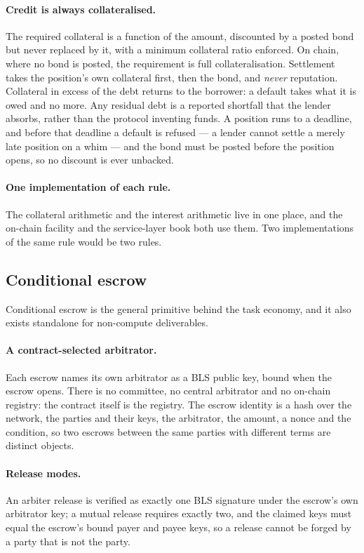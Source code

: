 \documentclass{article}
\begin{document}
\paragraph{Credit is always collateralised.} The required collateral is a
function of the amount, discounted by a posted bond but never replaced by it,
with a minimum collateral ratio enforced. On chain, where no bond is posted,
the requirement is full collateralisation. Settlement takes the position's own
collateral first, then the bond, and \emph{never} reputation. Collateral in
excess of the debt returns to the borrower: a default takes what it is owed
and no more. Any residual debt is a reported shortfall that the lender absorbs,
rather than the protocol inventing funds. A position runs to a deadline, and
before that deadline a default is refused --- a lender cannot settle a merely
late position on a whim --- and the bond must be posted before the position
opens, so no discount is ever unbacked.

\paragraph{One implementation of each rule.} The collateral arithmetic and the
interest arithmetic live in one place, and the on-chain facility and the
service-layer book both use them. Two implementations of the same rule would
be two rules.

\subsection{Conditional escrow}
\label{sec:escrow}

Conditional escrow is the general primitive behind the task economy, and it
also exists standalone for non-compute deliverables.

\paragraph{A contract-selected arbitrator.} Each escrow names its own
arbitrator as a BLS public key, bound when the escrow opens. There is no
committee, no central arbitrator and no on-chain registry: the contract
itself is the registry. The escrow identity is a hash over the network, the
parties and their keys, the arbitrator, the amount, a nonce and the condition,
so two escrows between the same parties with different terms are distinct
objects.

\paragraph{Release modes.} An arbiter release is verified as exactly one BLS
signature under the escrow's own arbitrator key; a mutual release requires
exactly two, and the claimed keys must equal the escrow's bound payer and
payee keys, so a release cannot be forged by a party that is not the party.
\end{document}

